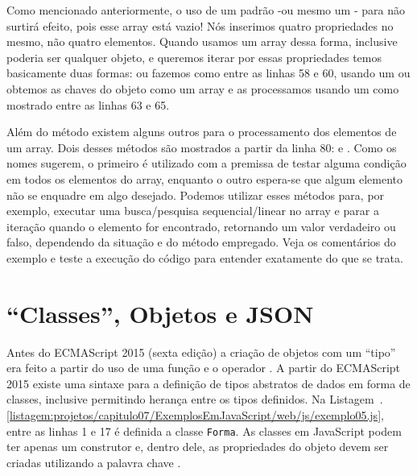 Como mencionado anteriormente, o uso de um  padrão -ou mesmo um - para  não surtirá efeito, pois esse array está vazio! Nós inserimos quatro propriedades no mesmo, não quatro elementos. Quando usamos um array dessa forma, inclusive poderia ser qualquer objeto, e queremos iterar por essas propriedades temos basicamente duas formas: ou fazemos como entre as linhas 58 e 60, usando um  ou obtemos as chaves do objeto como um array e as processamos usando um  como mostrado entre as linhas 63 e 65.

Além do método  existem alguns outros para o processamento dos elementos de um array. Dois desses métodos são mostrados a partir da linha 80:  e . Como os nomes sugerem, o primeiro é utilizado com a premissa de testar alguma condição em todos os elementos do array, enquanto o outro espera-se que algum elemento não se enquadre em algo desejado. Podemos utilizar esses métodos para, por exemplo, executar uma busca/pesquisa sequencial/linear no array e parar a iteração quando o elemento for encontrado, retornando um valor verdadeiro ou falso, dependendo da situação e do método empregado. Veja os comentários do exemplo e teste a execução do código para entender exatamente do que se trata.



\section{``Classes'', Objetos e JSON}

Antes do ECMAScript 2015 (sexta edição) a criação de objetos com um ``tipo'' era feito a partir do uso de uma função e o operador . A partir do ECMAScript 2015 existe uma sintaxe para a definição de tipos abstratos de dados em forma de classes, inclusive permitindo herança entre os tipos definidos. Na Listagem~\thechapter.\ref{listagem:projetos/capitulo07/ExemplosEmJavaScript/web/js/exemplo05.js}, entre as linhas 1 e 17 é definida a classe \texttt{Forma}. As classes em JavaScript podem ter apenas um construtor e, dentro dele, as propriedades do objeto devem ser criadas utilizando a palavra chave .


